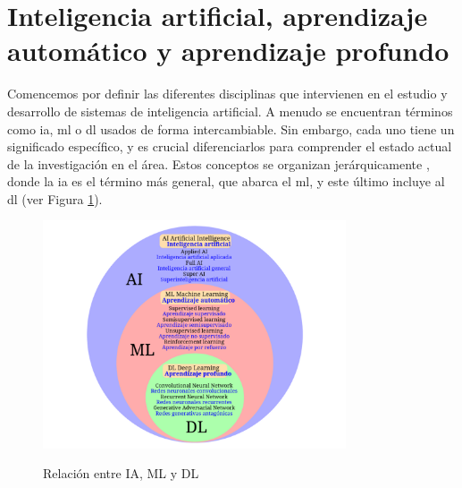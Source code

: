 
\section{Inteligencia artificial, aprendizaje automático y aprendizaje profundo}

Comencemos por definir las diferentes disciplinas que intervienen en el estudio y desarrollo de sistemas de inteligencia artificial. A menudo se encuentran términos como \gls{ia}, \gls{ml} o \gls{dl} usados de forma intercambiable. Sin embargo, cada uno tiene un significado específico, y es crucial diferenciarlos para comprender el estado actual de la investigación en el área. Estos conceptos se organizan jerárquicamente \citep{torresivinalsPythonDeepLearning2020}, donde la  \gls{ia} es el término más general, que abarca el \gls{ml}, y este último incluye al \gls{dl} (ver Figura \ref{fig:ai_ml_dl}).

\begin{figure}[H]
    \caption[Relación entre IA, ML y DL]{Relación entre IA, ML y DL}
    \centering
    \includegraphics[width=0.8\textwidth]{./figuras/AI_ML_DL.png}
    \label{fig:ai_ml_dl}
\end{figure}



